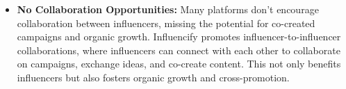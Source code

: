 \begin{justify}
\begin{itemize}
    \item \textbf{No Collaboration Opportunities:}
    Many platforms don’t encourage collaboration between influencers, missing the potential for co-created campaigns and organic growth.
    Influencify promotes influencer-to-influencer collaborations, where influencers can connect with each other to collaborate on campaigns, exchange ideas, and co-create content. This not only benefits influencers but also fosters organic growth and cross-promotion.
\end{itemize}
\end{justify}
